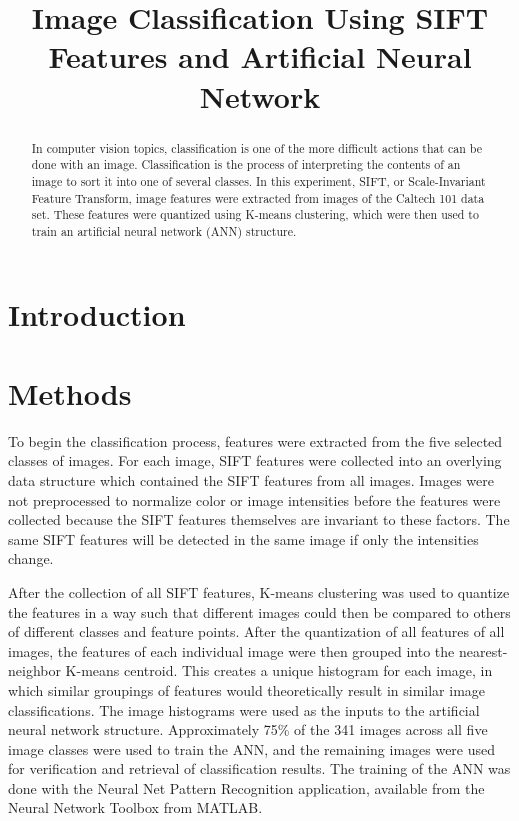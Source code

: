 \documentclass{article}
\title{Image Classification Using SIFT Features and Artificial Neural Network}
\begin{document}
%
\maketitle
%
\begin{abstract}
In computer vision topics, classification is one of the more difficult actions that can be done with an image. Classification is the process of interpreting the contents of an image to sort it into one of several classes. In this experiment, SIFT, or Scale-Invariant Feature Transform, image features were extracted from images of the Caltech 101 data set. These features were quantized using K-means clustering, which were then used to train an artificial neural network (ANN) structure. 
\end{abstract}
%
\section{Introduction}
\label{sec:intro}
%
\section{Methods}
\label{sec:methods}
To begin the classification process, features were extracted from the five selected classes of images. For each image, SIFT features were collected into an overlying data structure which contained the SIFT features from all images. Images were not preprocessed to normalize color or image intensities before the features were collected because the SIFT features themselves are invariant to these factors. The same SIFT features will be detected in the same image if only the intensities change.

After the collection of all SIFT features, K-means clustering was used to quantize the features in a way such that different images could then be compared to others of different classes and feature points.  After the quantization of all features of all images, the features of each individual image were then grouped into the nearest-neighbor K-means centroid. This creates a unique histogram for each image, in which similar groupings of features would theoretically result in similar image classifications. The image histograms were used as the inputs to the artificial neural network structure. Approximately 75\% of the 341 images across all five image classes were used to train the ANN, and the remaining images were used for verification and retrieval of classification results. The training of the ANN was done with the Neural Net Pattern Recognition application, available from the Neural Network Toolbox from MATLAB.
%
\end{document}
